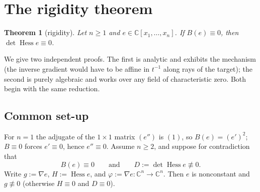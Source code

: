 \documentclass[11pt]{article}
\theoremstyle{plain}
\newtheorem{theorem}{Theorem}[section]
\theoremstyle{definition}
\newcommand{\C}{\mathbb{C}}
\newcommand{\Hess}{\operatorname{Hess}}
\begin{document}
\section{The rigidity theorem}\label{sec:G}

\begin{theorem}[rigidity]\label{thm:G}
Let $n\ge1$ and $e\in\C[x_1,\dots,x_n]$. If $B(e)\equiv0$, then
$\det\Hess e\equiv0$.
\end{theorem}

We give two independent proofs. The first is analytic and exhibits the
mechanism (the inverse gradient would have to be affine in $t^{-1}$
along rays of the target); the second is purely algebraic and works over
any field of characteristic zero. Both begin with the same reduction.

\subsection*{Common set-up}

For $n=1$ the adjugate of the $1\times1$ matrix $(e'')$ is $(1)$, so
$B(e)=(e')^2$; $B\equiv0$ forces $e'\equiv0$, hence $e''\equiv0$. Assume
$n\ge2$, and suppose for contradiction that
\[
B(e)\equiv0\qquad\text{and}\qquad D:=\det\Hess e\not\equiv0 .
\]
Write $g:=\nabla e$, $H:=\Hess e$, and $\varphi:=\nabla e:\C^n\to\C^n$.
Then $e$ is nonconstant and $g\not\equiv0$ (otherwise $H\equiv0$ and
$D\equiv0$).
\end{document}
